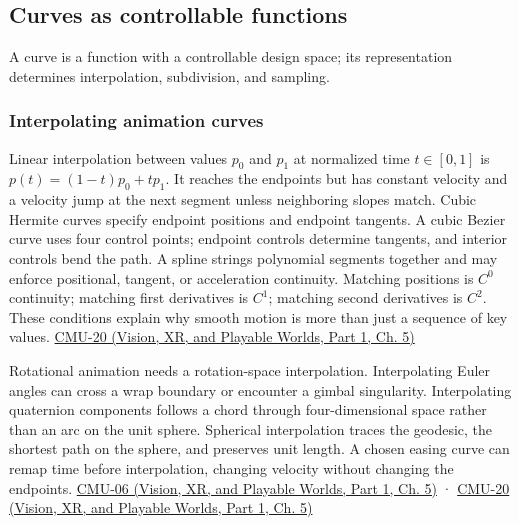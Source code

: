 \subsection{Curves as controllable functions}\label{03-visual-computing-i-ch001-curves-as-controllable-functions}

\hypertarget{03-visual-computing-i-ch001-curves-as-controllable-functions}{}

A curve is a function with a controllable design space; its representation determines interpolation, subdivision, and sampling.

\subsubsection{Interpolating animation curves}\label{03-visual-computing-i-ch001-interpolating-animation-curves}

\hypertarget{03-visual-computing-i-ch001-interpolating-animation-curves}{}

Linear interpolation between values \(p_0\) and \(p_1\) at normalized time \(t\in[0,1]\) is \(p(t)=(1-t)p_0+tp_1\). It reaches the endpoints but has constant velocity and a velocity jump at the next segment unless neighboring slopes match. Cubic Hermite curves specify endpoint positions and endpoint tangents. A cubic Bezier curve uses four control points; endpoint controls determine tangents, and interior controls bend the path. A spline strings polynomial segments together and may enforce positional, tangent, or acceleration continuity. Matching positions is \(C^0\) continuity; matching first derivatives is \(C^1\); matching second derivatives is \(C^2\). These conditions explain why smooth motion is more than just a sequence of key values. \href{../07-Vision-XR-and-Playable-Worlds-P01/main.pdf\#nameddest=04-visual-computing-ii-ch036-cmu-20---introduction-to-animation}{CMU-20 (Vision, XR, and Playable Worlds, Part 1, Ch. 5)}

Rotational animation needs a rotation-space interpolation. Interpolating Euler angles can cross a wrap boundary or encounter a gimbal singularity. Interpolating quaternion components follows a chord through four-dimensional space rather than an arc on the unit sphere. Spherical interpolation traces the geodesic, the shortest path on the sphere, and preserves unit length. A chosen easing curve can remap time before interpolation, changing velocity without changing the endpoints. \href{../07-Vision-XR-and-Playable-Worlds-P01/main.pdf\#nameddest=04-visual-computing-ii-ch036-cmu-06---3d-rotations-and-complex-representations}{CMU-06 (Vision, XR, and Playable Worlds, Part 1, Ch. 5)} · \href{../07-Vision-XR-and-Playable-Worlds-P01/main.pdf\#nameddest=04-visual-computing-ii-ch036-cmu-20---introduction-to-animation}{CMU-20 (Vision, XR, and Playable Worlds, Part 1, Ch. 5)}

